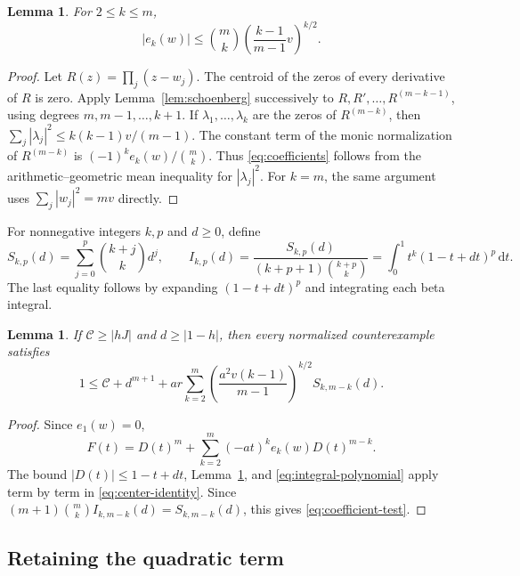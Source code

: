 \documentclass[11pt,reqno]{amsart}
\newtheorem{lem}[thm]{Lemma}
\theoremstyle{definition}
\theoremstyle{remark}
\numberwithin{equation}{section}
\newcommand{\dd}{\,\mathrm d}
\begin{document}
\begin{lem}\label{lem:coefficients}
For $2\le k\le m$,
\begin{equation}\label{eq:coefficients}
 |e_k(w)|\le\binom mk
 \left(\frac{k-1}{m-1}v\right)^{k/2}.
\end{equation}
\end{lem}
\begin{proof}
Let $R(z)=\prod_j(z-w_j)$. The centroid of the zeros of every derivative of $R$ is zero. Apply Lemma~\ref{lem:schoenberg} successively to $R,R',\ldots,R^{(m-k-1)}$, using degrees $m,m-1,\ldots,k+1$. If $\lambda_1,\ldots,\lambda_k$ are the zeros of $R^{(m-k)}$, then
$\sum_j|\lambda_j|^2\le k(k-1)v/(m-1)$.
The constant term of the monic normalization of $R^{(m-k)}$ is $(-1)^ke_k(w)/\binom mk$. Thus \eqref{eq:coefficients} follows from the arithmetic--geometric mean inequality for $|\lambda_j|^2$. For $k=m$, the same argument uses $\sum_j|w_j|^2=mv$ directly.
\end{proof}

For nonnegative integers $k,p$ and $d\ge0$, define
\begin{equation}\label{eq:integral-polynomial}
 S_{k,p}(d)=\sum_{j=0}^p\binom{k+j}{k}d^j,\qquad
 I_{k,p}(d)=\frac{S_{k,p}(d)}{(k+p+1)\binom{k+p}{k}}
          =\int_0^1t^k(1-t+dt)^p\dd t.
\end{equation}
The last equality follows by expanding $(1-t+dt)^p$ and integrating each beta integral.

\begin{lem}\label{lem:coefficient-test}
If $\mathcal C\ge|hJ|$ and $d\ge|1-h|$, then every normalized counterexample satisfies
\begin{equation}\label{eq:coefficient-test}
 1\le\mathcal C+d^{m+1}
  +ar\sum_{k=2}^m
     \left(\frac{a^2v(k-1)}{m-1}\right)^{k/2}S_{k,m-k}(d).
\end{equation}
\end{lem}
\begin{proof}
Since $e_1(w)=0$,
\begin{equation}\label{eq:product-expansion}
 F(t)=D(t)^m+\sum_{k=2}^m(-at)^ke_k(w)D(t)^{m-k}.
\end{equation}
The bound $|D(t)|\le1-t+dt$, Lemma~\ref{lem:coefficients}, and \eqref{eq:integral-polynomial} apply term by term in \eqref{eq:center-identity}. Since
$(m+1)\binom mk I_{k,m-k}(d)=S_{k,m-k}(d)$,
this gives \eqref{eq:coefficient-test}.
\end{proof}

\subsection{Retaining the quadratic term}
\end{document}
